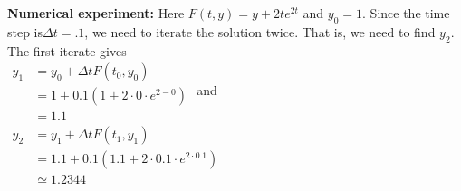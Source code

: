 \documentclass{article}
\begin{document}
{\bf Numerical experiment:}
Here $ F(t, y) = y + 2te^{2t} $ and $ y_0 = 1. $ Since the time step is$  \Delta t = .1 $,
we need to iterate the solution twice. That is, we need to find $ y_2. $ The first iterate
gives\\
$\begin{aligned} y _ { 1 } & = y _ { 0 } + \Delta t F \left( t _ { 0 } , y _ { 0 } \right) \\ & = 1 + 0.1 \left( 1 + 2 \cdot 0 \cdot e ^ { 2 - 0 } \right) \\ & = 1.1 \end{aligned}$
and\\
$\begin{aligned} y _ { 2 } & = y _ { 1 } + \Delta t F \left( t _ { 1 } , y _ { 1 } \right) \\ & = 1.1 + 0.1 \left( 1.1 + 2 \cdot 0.1 \cdot e ^ { 2 \cdot 0.1 } \right) \\ & \simeq 1.2344 \end{aligned}$
\end{document}
